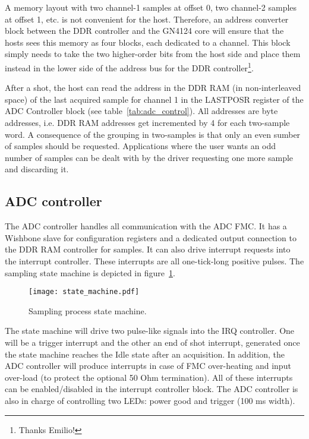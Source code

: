 \documentclass{article}
\begin{document}
A memory layout with two channel-1 samples at offset 0, two channel-2 samples at offset 1, etc. is not convenient for the host. Therefore, an address converter block between the DDR controller and the GN4124 core will ensure that the hosts sees this memory as four blocks, each dedicated to a channel. This block simply needs to take the two higher-order bits from the host side and place them instead in the lower side of the address bus for the DDR controller\footnote{Thanks Emilio!}.
 
After a shot, the host can read the address in the DDR RAM (in non-interleaved space) of the last acquired sample for channel 1 in the LASTPOSR register of the ADC Controller block (see table~\ref{tab:adc_control}). All addresses are byte addresses, i.e. DDR RAM addresses get incremented by 4 for each two-sample word. A consequence of the grouping in two-samples is that only an even sumber of samples should be requested. Applications where the user wants an odd number of samples can be dealt with by the driver requesting one more sample and discarding it. 

\subsection{ADC controller}
The ADC controller handles all communication with the ADC FMC. It has a Wishbone slave for configuration registers and a dedicated output connection to the DDR RAM controller for samples. It can also drive interrupt requests into the interrupt controller. These interrupts are all one-tick-long positive pulses. The sampling state machine is depicted in figure~\ref{fig:state_machine}. 

\begin{figure}[htbp]
  \centering
  \texttt{[image: state\_machine.pdf]}
  \caption{Sampling process state machine.}
  \label{fig:state_machine}
\end{figure}

The state machine will drive two pulse-like signals into the IRQ controller. One will be a trigger interrupt and the other an end of shot interrupt, generated once the state machine reaches the Idle state after an acquisition. In addition, the ADC controller will produce interrupts in case of FMC over-heating and input over-load (to protect the optional 50 Ohm termination). All of these interrupts can be enabled/disabled in the interrupt controller block. The ADC controller is also in charge of controlling two LEDs: power good and trigger (100 ms width).
\end{document}

